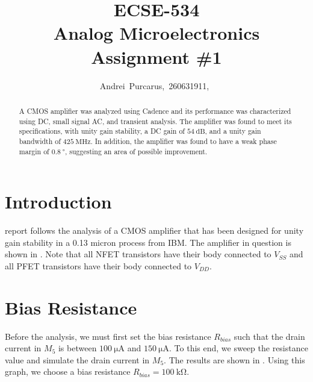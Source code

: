 \documentclass[journal,hidelinks]{IEEEtran}
\title{ECSE-534 \\ Analog Microelectronics \\ Assignment \#1}
\author{Andrei~Purcarus,~260631911,~\IEEEmembership{McGill~University}}
\begin{document}
\sloppy

\maketitle

\begin{abstract}

A CMOS amplifier was analyzed using Cadence and its performance was characterized using DC, small signal AC, and transient analysis. The amplifier was found to meet its specifications, with unity gain stability, a DC gain of $\SI{54}{\deci\bel}$, and a unity gain bandwidth of $\SI{425}{\mega\hertz}$. In addition, the amplifier was found to have a weak phase margin of $\SI{0.8}{\degree}$, suggesting an area of possible improvement.

\end{abstract}

\section{Introduction}

 report follows the analysis of a CMOS amplifier that has been designed for unity gain stability in a 0.13 micron process from IBM. The amplifier in question is shown in . Note that all NFET transistors have their body connected to $V_{SS}$ and all PFET transistors have their body connected to $V_{DD}$.

\section{Bias Resistance}

Before the analysis, we must first set the bias resistance $R_{bias}$ such that the drain current in $M_5$ is between $\SI{100}{\micro\ampere}$ and $\SI{150}{\micro\ampere}$. To this end, we sweep the resistance value and simulate the drain current in $M_5$. The results are shown in . Using this graph, we choose a bias resistance $R_{bias} = \SI{100}{\kilo\ohm}$.
\end{document}
